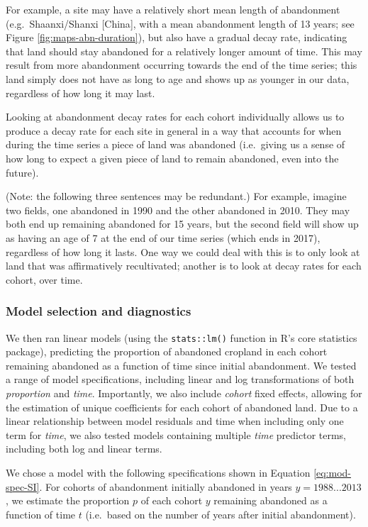 \documentclass[9pt,twoside,lineno]{pnas-new}
\begin{document}
For example, a site may have a relatively short mean length of abandonment (e.g.~Shaanxi/Shanxi {[}China{]}, with a mean abandonment length of 13 years; see Figure \ref{fig:maps-abn-duration}), but also have a gradual decay rate, indicating that land should stay abandoned for a relatively longer amount of time.
This may result from more abandonment occurring towards the end of the time series; this land simply does not have as long to age and shows up as younger in our data, regardless of how long it may last.

Looking at abandonment decay rates for each cohort individually allows us to produce a decay rate for each site in general in a way that accounts for when during the time series a piece of land was abandoned (i.e.~giving us a sense of how long to expect a given piece of land to remain abandoned, even into the future).

(Note: the following three sentences may be redundant.)
For example, imagine two fields, one abandoned in 1990 and the other abandoned in 2010.
They may both end up remaining abandoned for 15 years, but the second field will show up as having an age of 7 at the end of our time series (which ends in 2017), regardless of how long it lasts.
One way we could deal with this is to only look at land that was affirmatively recultivated; another is to look at decay rates for each cohort, over time.

\hypertarget{model-selection-and-diagnostics}{%
\subsubsection{Model selection and diagnostics}\label{model-selection-and-diagnostics}}

We then ran linear models (using the \texttt{stats::lm()} function in R's core statistics package), predicting the proportion of abandoned cropland in each cohort remaining abandoned as a function of time since initial abandonment.
We tested a range of model specifications, including linear and log transformations of both \emph{proportion} and \emph{time}.
Importantly, we also include \emph{cohort} fixed effects, allowing for the estimation of unique coefficients for each cohort of abandoned land.
Due to a linear relationship between model residuals and time when including only one term for \emph{time}, we also tested models containing multiple \emph{time} predictor terms, including both log and linear terms.

We chose a model with the following specifications shown in Equation \eqref{eq:mod-spec-SI}.
For cohorts of abandonment initially abandoned in years \(y = 1988 ... 2013\), we estimate the proportion \(p\) of each cohort \(y\) remaining abandoned as a function of time \(t\) (i.e.~based on the number of years after initial abandonment).
\end{document}
